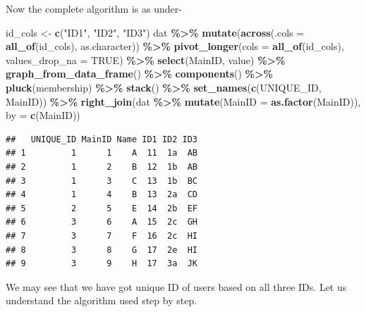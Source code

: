 \documentclass[
]{book}
\newenvironment{Shaded}{\begin{snugshade}}{\end{snugshade}}
\newcommand{\AttributeTok}[1]{\textcolor[rgb]{0.13,0.29,0.53}{#1}}
\newcommand{\ConstantTok}[1]{\textcolor[rgb]{0.56,0.35,0.01}{#1}}
\newcommand{\FunctionTok}[1]{\textcolor[rgb]{0.13,0.29,0.53}{\textbf{#1}}}
\newcommand{\NormalTok}[1]{#1}
\newcommand{\OtherTok}[1]{\textcolor[rgb]{0.56,0.35,0.01}{#1}}
\newcommand{\SpecialCharTok}[1]{\textcolor[rgb]{0.81,0.36,0.00}{\textbf{#1}}}
\newcommand{\StringTok}[1]{\textcolor[rgb]{0.31,0.60,0.02}{#1}}
\begin{document}
Now the complete algorithm is as under-

\begin{Shaded}
\begin{Highlighting}[]
\NormalTok{id\_cols }\OtherTok{\textless{}{-}} \FunctionTok{c}\NormalTok{(}\StringTok{"ID1"}\NormalTok{, }\StringTok{"ID2"}\NormalTok{, }\StringTok{"ID3"}\NormalTok{)}
\NormalTok{dat }\SpecialCharTok{\%\textgreater{}\%} 
  \FunctionTok{mutate}\NormalTok{(}\FunctionTok{across}\NormalTok{(}\AttributeTok{.cols =} \FunctionTok{all\_of}\NormalTok{(id\_cols), as.character)) }\SpecialCharTok{\%\textgreater{}\%} 
  \FunctionTok{pivot\_longer}\NormalTok{(}\AttributeTok{cols =} \FunctionTok{all\_of}\NormalTok{(id\_cols), }
               \AttributeTok{values\_drop\_na =} \ConstantTok{TRUE}\NormalTok{) }\SpecialCharTok{\%\textgreater{}\%} 
  \FunctionTok{select}\NormalTok{(MainID, value) }\SpecialCharTok{\%\textgreater{}\%} 
  \FunctionTok{graph\_from\_data\_frame}\NormalTok{() }\SpecialCharTok{\%\textgreater{}\%}
  \FunctionTok{components}\NormalTok{() }\SpecialCharTok{\%\textgreater{}\%}
  \FunctionTok{pluck}\NormalTok{(membership) }\SpecialCharTok{\%\textgreater{}\%}
  \FunctionTok{stack}\NormalTok{() }\SpecialCharTok{\%\textgreater{}\%}
  \FunctionTok{set\_names}\NormalTok{(}\FunctionTok{c}\NormalTok{(}\StringTok{\textquotesingle{}UNIQUE\_ID\textquotesingle{}}\NormalTok{, }\StringTok{\textquotesingle{}MainID\textquotesingle{}}\NormalTok{)) }\SpecialCharTok{\%\textgreater{}\%}
  \FunctionTok{right\_join}\NormalTok{(dat }\SpecialCharTok{\%\textgreater{}\%} 
               \FunctionTok{mutate}\NormalTok{(}\AttributeTok{MainID =} \FunctionTok{as.factor}\NormalTok{(MainID)), }
             \AttributeTok{by =} \FunctionTok{c}\NormalTok{(}\StringTok{\textquotesingle{}MainID\textquotesingle{}}\NormalTok{))}
\end{Highlighting}
\end{Shaded}

\begin{verbatim}
##   UNIQUE_ID MainID Name ID1 ID2 ID3
## 1         1      1    A  11  1a  AB
## 2         1      2    B  12  1b  AB
## 3         1      3    C  13  1b  BC
## 4         1      4    B  13  2a  CD
## 5         2      5    E  14  2b  EF
## 6         3      6    A  15  2c  GH
## 7         3      7    F  16  2c  HI
## 8         3      8    G  17  2e  HI
## 9         3      9    H  17  3a  JK
\end{verbatim}

We may see that we have got unique ID of users based on all three IDs. Let us understand the algorithm used step by step.
\end{document}
